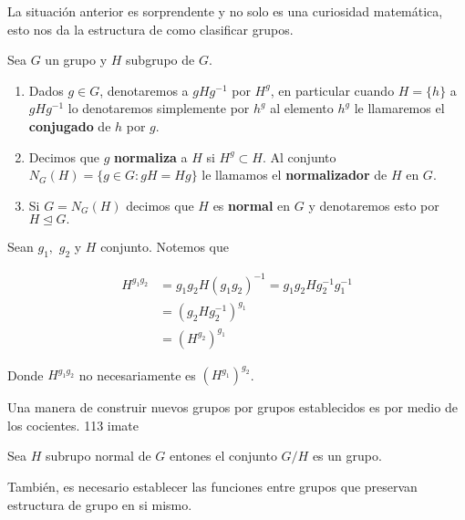 La situación anterior es sorprendente y no solo es una curiosidad matemática, esto nos da la estructura de como clasificar grupos. 
	
\begin{df}
Sea $G$ un grupo y $H$ subgrupo de $G$.
	
\begin{enumerate}
    \item Dados $g \in G$, denotaremos a $gHg^{-1}$ por $H^g$, en particular cuando $H=\{h\}$ a $gHg^{-1}$ lo denotaremos simplemente por  $h^g$ al elemento $h^{g}$ le llamaremos el \textbf{conjugado} de $h$ por $g$. 
	\item  Decimos que $g$ \textbf{normaliza} a $H$ si $H^{g} \subset H.$ Al conjunto $N_G(H)=\{g \in G: gH=Hg\}$ le llamamos el \textbf{normalizador} de $H$ en $G$.
	\item Si $G=N_G(H)$ decimos que $H$ es \textbf{normal} en $G$ y denotaremos esto por $H \unlhd G.$
		
\end{enumerate}
\end{df}
	
\begin{ob}
Sean $g_1,$ $g_2 $ y $H$ conjunto. Notemos que

\begin{align*}
H^{g_1g_2} &=g_1g_2H(g_1g_2)^{-1}=g_1g_2Hg_2^{-1}g_1^{-1}\\
&=(g_2Hg_2^{-1})^{g_1} \\
& = (H^{g_2})^{g_1}
\end{align*}

Donde $H^{g_1g_2}$ no necesariamente es $(H^{g_1})^{g_2}$.
\end{ob}
	Una manera de construir nuevos grupos por grupos establecidos es por medio de los cocientes. 	113 imate
	
	\begin{te}
	Sea $H$ subrupo normal de  $G$ entones el conjunto $G/H$ es un grupo.
	\end{te}
	
	También, es necesario establecer las funciones entre grupos que preservan estructura de grupo en si mismo.
	
